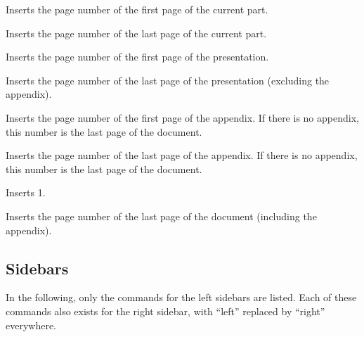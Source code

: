 \begin{command}{\insertpartstartpage}
  Inserts the page number of the first page of the current part.
\end{command}

\begin{command}{\insertpartendpage}
  Inserts the page number of the last page of the current part.
\end{command}

\begin{command}{\insertpresentationstartpage}
  Inserts the page number of the first page of the presentation.
\end{command}

\begin{command}{\insertpresentationendpage}
  Inserts the page number of the last page of the presentation
  (excluding the appendix).
\end{command}


\begin{command}{\insertappendixstartpage}
  Inserts the page number of the first page of the appendix. If there
  is no appendix, this number is the last page of the document.
\end{command}

\begin{command}{\insertappendixendpage}
  Inserts the page number of the last page of the appendix. If there
  is no appendix, this number is the last page of the document.
\end{command}

\begin{command}{\insertdocumentstartpage}
  Inserts 1.
\end{command}

\begin{command}{\insertdocumentendpage}
  Inserts the page number of the last page of the document (including
  the appendix).
\end{command}




\subsection{Sidebars}

\label{section-sidebar-templates}

In the following, only the commands for the left sidebars are
listed. Each of these commands also exists for the right sidebar,
with ``left'' replaced by ``right'' everywhere.


